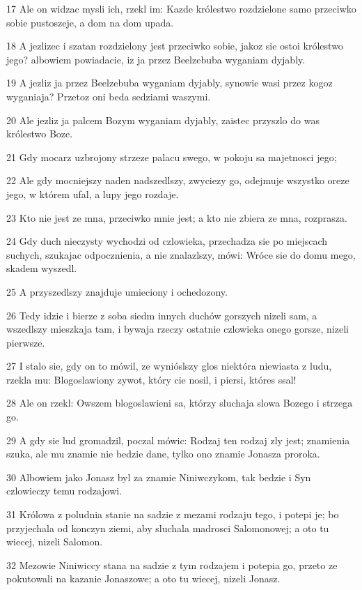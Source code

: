 \par 17 Ale on widzac mysli ich, rzekl im: Kazde królestwo rozdzielone samo przeciwko sobie pustoszeje, a dom na dom upada.
\par 18 A jezlizec i szatan rozdzielony jest przeciwko sobie, jakoz sie ostoi królestwo jego? albowiem powiadacie, iz ja przez Beelzebuba wyganiam dyjably.
\par 19 A jezliz ja przez Beelzebuba wyganiam dyjably, synowie wasi przez kogoz wyganiaja? Przetoz oni beda sedziami waszymi.
\par 20 Ale jezliz ja palcem Bozym wyganiam dyjably, zaistec przyszlo do was królestwo Boze.
\par 21 Gdy mocarz uzbrojony strzeze palacu swego, w pokoju sa majetnosci jego;
\par 22 Ale gdy mocniejszy naden nadszedlszy, zwyciezy go, odejmuje wszystko oreze jego, w którem ufal, a lupy jego rozdaje.
\par 23 Kto nie jest ze mna, przeciwko mnie jest; a kto nie zbiera ze mna, rozprasza.
\par 24 Gdy duch nieczysty wychodzi od czlowieka, przechadza sie po miejscach suchych, szukajac odpocznienia, a nie znalazlszy, mówi: Wróce sie do domu mego, skadem wyszedl.
\par 25 A przyszedlszy znajduje umieciony i ochedozony.
\par 26 Tedy idzie i bierze z soba siedm innych duchów gorszych nizeli sam, a wszedlszy mieszkaja tam, i bywaja rzeczy ostatnie czlowieka onego gorsze, nizeli pierwsze.
\par 27 I stalo sie, gdy on to mówil, ze wynióslszy glos niektóra niewiasta z ludu, rzekla mu: Blogoslawiony zywot, który cie nosil, i piersi, któres ssal!
\par 28 Ale on rzekl: Owszem blogoslawieni sa, którzy sluchaja slowa Bozego i strzega go.
\par 29 A gdy sie lud gromadzil, poczal mówic: Rodzaj ten rodzaj zly jest; znamienia szuka, ale mu znamie nie bedzie dane, tylko ono znamie Jonasza proroka.
\par 30 Albowiem jako Jonasz byl za znamie Niniwczykom, tak bedzie i Syn czlowieczy temu rodzajowi.
\par 31 Królowa z poludnia stanie na sadzie z mezami rodzaju tego, i potepi je; bo przyjechala od konczyn ziemi, aby sluchala madrosci Salomonowej; a oto tu wiecej, nizeli Salomon.
\par 32 Mezowie Niniwiccy stana na sadzie z tym rodzajem i potepia go, przeto ze pokutowali na kazanie Jonaszowe; a oto tu wiecej, nizeli Jonasz.
